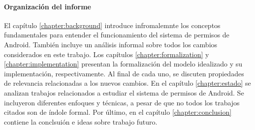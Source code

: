 \paragraph{Organización del informe}
El capítulo \ref{chapter:background} introduce infromalemnte los conceptos fundamentales para
entender el funcionamiento del sistema de permisos de Android. También incluye un análisis informal
sobre todos los cambios considerados en este trabajo. Los capítulos \ref{chapter:formalization} y
\ref{chapter:implementation} presentan la formalización del modelo idealizado y su implementación,
respectivamente. Al final de cada uno, se discuten propiedades de relevancia relacionadas a los
nuevos cambios. En el capítulo \ref{chapter:estado} se analizan trabajos relacionados a estudiar el
sistema de permisos de Android. Se incluyeron diferentes enfoques y técnicas, a pesar de que no
todos los trabajos citados son de índole formal. Por último, en el capítulo \ref{chapter:conclusion}
contiene la conclsuión e ideas sobre trabajo futuro.